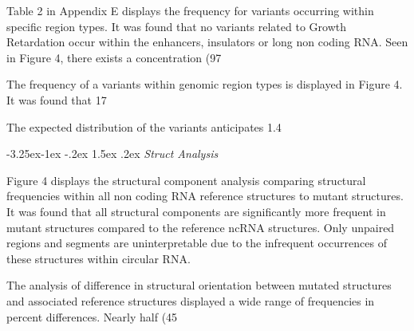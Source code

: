 \documentclass[11pt]{article}
\makeatletter
\renewcommand\subsection{\@startsection{subsection}{2}{\z@}%
                                         {-3.25ex\@plus -1ex \@minus -.2ex}%
                                         {1.5ex \@plus .2ex}%
                                         {\normalfont\fontfamily{phv}\fontsize{14}{17}\bfseries}}
\makeatother
\begin{document}
Table 2 in Appendix E displays the frequency for variants occurring within specific region types. It was found that no variants related to Growth Retardation occur within the enhancers, insulators or long non coding RNA. Seen in Figure 4, there exists a concentration (97%

The frequency of a variants within genomic region types is displayed in Figure 4. It was found that 17%

The expected distribution of the variants anticipates 1.4%

\subsection{
\emph{Struct Analysis}} \label{s:conclusion}

Figure 4 displays the structural component analysis comparing structural frequencies within all non coding RNA reference structures to mutant structures. It was found that all structural components are significantly more frequent in mutant structures compared to the reference ncRNA structures. Only unpaired regions and segments are uninterpretable due to the infrequent occurrences of these structures within circular RNA.  

The analysis of difference in structural orientation between mutated structures and associated reference structures displayed a wide range of frequencies in percent differences. Nearly half (45%
\end{document}

